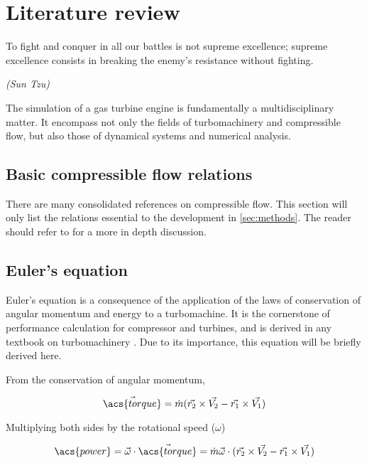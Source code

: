 \documentclass[tcc]{subfiles}
\begin{document}
\textual



\chapter{Literature review}
\epigraph{To fight and conquer in all our battles is not supreme excellence; supreme excellence consists in breaking the enemy's resistance without fighting.}{\em(Sun Tzu)}

The simulation of a gas turbine engine is fundamentally a multidisciplinary matter.
It encompass not only the fields of turbomachinery and compressible flow, 
but also those of dynamical systems and numerical analysis. 

\section{Basic compressible flow relations}
There are many consolidated references on compressible flow. 
This section will only list the relations essential to the development in \cref{sec:methods}. 
The reader should refer to \textcite{Anderson, Shapiro} for a more in depth discussion.

\section{Euler's equation}
\label{sec:euler_equation}
Euler's equation is a consequence of the application of the laws of conservation of angular momentum and energy to a turbomachine. It is the cornerstone of performance calculation for compressor and turbines, and is derived in any textbook on turbomachinery \cite{Lakshminarayana1996, Dixon1998, Schobeiri2004, Hill1991, Logan2003, Baskharone2006}. Due to its importance, this equation will be briefly derived here.

From the conservation of angular momentum, 

\begin{equation}
    \vec{\acs{torque}} = \dot{m} (\vec{r_2}\cross\vec{V_2} - \vec{r_1}\cross\vec{V_1}) 
\end{equation}

Multiplying both sides by the rotational speed ($\omega$)

\begin{equation}
    \acs{power} = \vec{\omega}\cdot\vec{\acs{torque}} 
                = \dot{m} \vec{\omega} \cdot (\vec{r_2}\cross\vec{V_2} - \vec{r_1}\cross\vec{V_1}) 
\end{equation}
\end{document}
